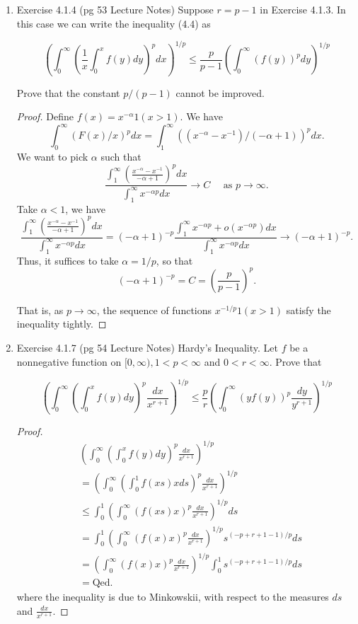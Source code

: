 \begin{enumerate}
\item Exercise 4.1.4 (pg 53 Lecture Notes) 
	Suppose $r=p-1$ in Exercise 4.1.3. In this case we can write the inequality (4.4) as

\[
\left(\int_0^{\infty}\left(\frac{1}{x} \int_0^x f(y) d y\right)^p d x\right)^{1 / p} \leq \frac{p}{p-1}\left(\int_0^{\infty}(f(y))^p d y\right)^{1 / p}
\]


Prove that the constant $p /(p-1)$ cannot be improved.

\begin{proof}
	Define $f(x) = x^{- \alpha} 1(x > 1)$. We have
	\[
		\int _0^\infty \left( F(x) / x \right) ^p dx = \int _1^\infty  \left(\left( x^{- \alpha} - x^{- 1} \right) / (- \alpha + 1)\right)^p dx
	.\] 
	We want to pick $\alpha$ such that
	\[
		\frac{\int _1^\infty \left(  \frac{x^{- \alpha} - x^{-1}}{- \alpha + 1} \right)^p d x }{
		\int _1^\infty x^{- \alpha p} dx}
		\to C
		\quad \text{ as } p \to \infty 
	.\] 
	Take $\alpha < 1$, we have 
\[
	\frac{\int _1^\infty \left(  \frac{x^{- \alpha} - x^{-1}}{- \alpha + 1} \right)^p d x }{
		\int _1^\infty x^{- \alpha p} dx}
		=
		(- \alpha + 1)^{- p} \frac{\int _1^\infty x^{- \alpha p} + o(x^{- \alpha p}) d x }{
		\int _1^\infty x^{- \alpha p} dx} \to (- \alpha + 1)^{- p}
.\] 
Thus, it suffices to take $\alpha = 1/p$, so that
\[
	(- \alpha + 1)^{- p} = C = \left( \frac{p}{p - 1} \right) ^p
.\] 

That is, as $p \to \infty $, the sequence of functions $x^{- 1 / p}1(x>1)$ satisfy the inequality tightly.

\end{proof}


\item Exercise 4.1.7 (pg 54 Lecture Notes) 
Hardy's Inequality. Let $f$ be a nonnegative function on $[0, \infty), 1<p<\infty$ and $0<r<\infty$. Prove that

\[
\left(\int_0^{\infty}\left(\int_0^x f(y) d y\right)^p \frac{d x}{x^{r+1}}\right)^{1 / p} \leq \frac{p}{r}\left(\int_0^{\infty}(y f(y))^p \frac{d y}{y^{r+1}}\right)^{1 / p}
\]
\begin{proof}
	\begin{align*}
		& \left( \int _0^\infty \left( \int _0^x f(y) d y \right) ^p  \frac{d x}{x^{r + 1}} \right)^{1 / p} \\
		&= \left( \int _0^\infty \left( \int _0^1 f(xs)x d s \right) ^p  \frac{d x}{x^{r + 1}} \right)^{1 / p} \\
		&\le   \int _0^1\left( \int _0^\infty \left( f(xs)x \right) ^p  \frac{d x}{x^{r + 1}} \right)^{1 / p} ds \\
		&= \int _0^1\left( \int _0^\infty \left( f(x)x \right) ^p  \frac{d x}{x^{r + 1}} \right)^{1 / p} s^{(- p + r + 1 - 1) / p} ds \\
		&= \left( \int _0^\infty \left( f(x)x \right) ^p  \frac{d x}{x^{r + 1}} \right)^{1 / p} \int _0^1 s^{(- p + r + 1 - 1) / p} ds \\
		&= \text{Qed}
	.\end{align*}
	where the inequality is due to Minkowskii, with respect to the measures $ds$ and $\frac{dx}{x^{r + 1}}$.
\end{proof}


\end{enumerate}
